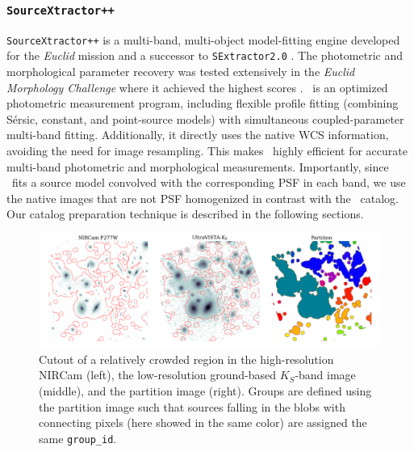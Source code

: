 \documentclass[longauth]{aa}
\begin{document}
\subsubsection{\texttt{SourceXtractor++}} \label{sec:SE++desc}

\texttt{SourceXtractor++} \citep[hereafter \SEpp]{bertin20,kummel20, Kummel2022} is a multi-band, multi-object model-fitting engine developed for the \textit{Euclid} mission \citep{Laureijs2011, EuclidMellier2024} and a successor to \texttt{SExtractor2.0} \citep{bertin_sextractor_1996}. The photometric and morphological parameter recovery was tested extensively in the \textit{Euclid Morphology Challenge} where it achieved the highest scores \citep{HubertEMC2022, MerlinEMC2022}. \SEpp\ is an optimized photometric measurement program, including flexible profile fitting (combining S\'ersic, constant, and point-source models) with simultaneous coupled-parameter multi-band fitting. Additionally, it directly uses the native WCS information, avoiding the need for image resampling. This makes \SEpp\ highly efficient for accurate multi-band photometric and morphological measurements. Importantly, since \SEpp\ fits a source model convolved with the corresponding PSF in each band, we use the native images that are not PSF homogenized in contrast with the \hotcold\ catalog. Our catalog preparation technique is described in the following sections. 

\begin{figure}[t!]
\includegraphics[width=1\textwidth]{figures/DetectionSegmentation_example2.pdf}
\caption{Cutout of a relatively crowded region in the high-resolution NIRCam (left), the low-resolution ground-based \UVISTA $K_{S}$-band image (middle), and the partition image (right). Groups are defined using the partition image such that sources falling in the blobs with connecting pixels (here showed in the same color) are assigned the same \texttt{group\_id}.}
\label{fig:DetectionSegmentation_example}
\end{figure}
\end{document}
